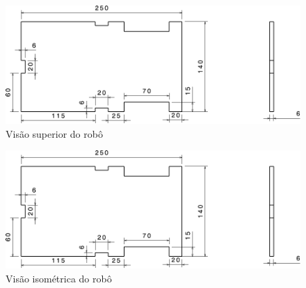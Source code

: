 \begin{figure}[htb]
  \caption{\label{fig:structure-up} Visão superior do robô}

  \begin{center}
    \includegraphics[scale=0.525,page=5]{../img/structure.pdf}
  \end{center}

\end{figure}

\begin{figure}[htb]
  \caption{\label{fig:structure-iso} Visão isométrica do robô}

  \begin{center}
    \includegraphics[scale=0.525,page=6]{../img/structure.pdf}
  \end{center}

\end{figure}

%
%
\newpage
